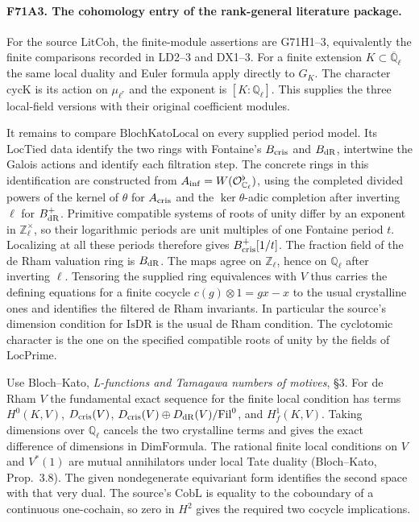 \paragraph{F71A3. The cohomology entry of the rank-general literature package.}
For the source $\mathrm{LitCoh}$, the finite-module assertions
are G71H1--3, equivalently the finite comparisons recorded in
LD2--3 and DX1--3. For a finite extension
$K\subset\overline{\mathbb Q}_\ell$ the same local duality and
Euler formula apply directly to $G_K$. The character
$\mathrm{cycK}$ is its action on $\mu_{\ell^r}$ and the
exponent is $[K:\mathbb Q_\ell]$. This supplies the three
local-field versions with their original coefficient modules.

It remains to compare $\mathrm{BlochKatoLocal}$ on every supplied
period model. Its $\mathrm{LocTied}$ data identify the two rings
with Fontaine's $B_{\rm cris}$ and $B_{\rm dR}$, intertwine the
Galois actions and identify each filtration step. The concrete
rings in this identification are constructed from
$A_{\rm inf}=W(\mathcal O_{\mathbb C_\ell}^{\flat})$, using the
completed divided powers of the kernel of $\theta$ for
$A_{\rm cris}$ and the $\ker\theta$-adic completion after
inverting $\ell$ for $B_{\rm dR}^+$. Primitive compatible systems
of roots of unity differ by an exponent in $\mathbb Z_\ell^\times$,
so their logarithmic periods are unit multiples of one Fontaine
period $t$. Localizing at all these periods therefore gives
$B_{\rm cris}^+[1/t]$. The fraction field of the de Rham
valuation ring is $B_{\rm dR}$. The maps agree on
$\mathbb Z_\ell$, hence on $\mathbb Q_\ell$ after inverting
$\ell$. Tensoring the supplied ring equivalences with $V$ thus
carries the defining equations for a finite cocycle
$c(g)\otimes1=g x-x$ to the usual crystalline ones and identifies
the filtered de Rham invariants. In particular the source's
dimension condition for $\mathrm{IsDR}$ is the usual de Rham
condition. The cyclotomic character is the one on the specified
compatible roots of unity by the fields of $\mathrm{LocPrime}$.

Use Bloch--Kato, \emph{L-functions and Tamagawa numbers of motives},
\S3. For de Rham $V$ the fundamental exact sequence for the finite
local condition has terms $H^0(K,V)$, $D_{\rm cris}(V)$,
$D_{\rm cris}(V)\oplus D_{\rm dR}(V)/\mathrm{Fil}^0$, and
$H_f^1(K,V)$. Taking dimensions over $\mathbb Q_\ell$ cancels
the two crystalline terms and gives the exact difference of
dimensions in $\mathrm{DimFormula}$. The rational finite local
conditions on $V$ and $V^*(1)$ are mutual annihilators under
local Tate duality (Bloch--Kato, Prop.~3.8). The given
nondegenerate equivariant form identifies the second space with
that very dual. The source's $\mathrm{CobL}$ is equality to the
coboundary of a continuous one-cochain, so zero in $H^2$ gives
the required two cocycle implications.

